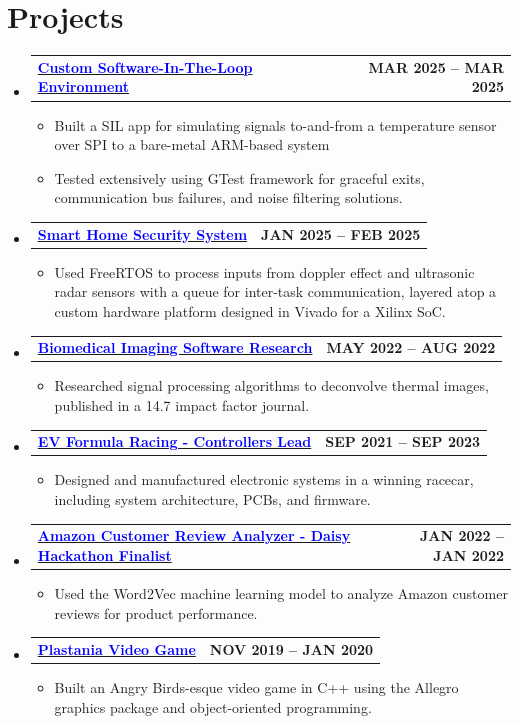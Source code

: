 \documentclass[letterpaper,11pt]{article}
\makeatletter
\newcommand{\resumeItem}[1]{
  \item\small{#1}
}
\newcommand{\resumeProjectHeading}[2]{
    \item
    \begin{tabular*}{1.001\textwidth}{l@{\extracolsep{\fill}}r}
      \small#1 & \textbf{\small #2}\\
    \end{tabular*}\vspace{-7pt}
}
\newcommand{\resumeSubHeadingListStart}{\begin{itemize}[leftmargin=0.0in, label={}]}
\newcommand{\resumeSubHeadingListEnd}{\end{itemize}}
\newcommand{\resumeItemListStart}{\begin{itemize}[itemsep=0pt, parsep=0pt, topsep=2pt, partopsep=0pt]}
\newcommand{\resumeItemListEnd}{\end{itemize}\vspace{-5pt}}
\makeatother
\begin{document}
\section{Projects}
    \vspace{-5pt}
    \resumeSubHeadingListStart
      \resumeProjectHeading
          {\textbf{\href{https://github.com/asso-the-coder/SIL-environment}{\textcolor{blue}{Custom Software-In-The-Loop Environment}}}}{ MAR 2025 -- MAR 2025}
          \resumeItemListStart
            \resumeItem{Built a SIL app for simulating signals to-and-from a temperature sensor over SPI to a bare-metal ARM-based system}
            \resumeItem{Tested extensively using GTest framework for graceful exits, communication bus failures, and noise filtering solutions.}
          \resumeItemListEnd
          \vspace{-13pt}
      \resumeProjectHeading
          {\textbf{\href{https://github.com/asso-the-coder/home-security-system-pynq-z2}{\textcolor{blue}{Smart Home Security System}}}}{ JAN 2025 -- FEB 2025}
          \resumeItemListStart
            \resumeItem{Used FreeRTOS to process inputs from doppler effect and ultrasonic radar sensors with a queue for inter-task communication, layered atop a custom hardware platform designed in Vivado for a Xilinx SoC.}
          \resumeItemListEnd
          \vspace{-13pt}
      \resumeProjectHeading
          {\textbf{\href{https://www.science.org/doi/10.1126/sciadv.adi1899}{\textcolor{blue}{Biomedical Imaging Software Research}}}}{ MAY 2022 -- AUG 2022}
          \resumeItemListStart
            \resumeItem{Researched signal processing algorithms to deconvolve thermal images, published in a 14.7 impact factor journal.}
          \resumeItemListEnd
          \vspace{-13pt}
      \resumeProjectHeading
            {\textbf{\href{https://drive.google.com/drive/folders/1Gp0THWEDytKAZaY5z9e0QTf7O2gkgbx3}{\textcolor{blue}{EV Formula Racing - Controllers Lead}}}}{ SEP 2021 -- SEP 2023}
          \resumeItemListStart
            \resumeItem{Designed and manufactured electronic systems in a winning racecar, including system architecture, PCBs, and firmware.}
          \resumeItemListEnd
          \vspace{-13pt}
      \resumeProjectHeading
          {\textbf{\href{https://github.com/asso-the-coder/synonyms-finder}{\textcolor{blue}{Amazon Customer Review Analyzer - Daisy Hackathon Finalist}}}}{ JAN 2022 -- JAN 2022}
          \resumeItemListStart
            \resumeItem{Used the Word2Vec machine learning model to analyze Amazon customer reviews for product performance.}
          \resumeItemListEnd
          \vspace{-13pt}
      \resumeProjectHeading
          {\textbf{\href{https://github.com/asso-the-coder/plastania-video-game}{\textcolor{blue}{Plastania Video Game}}}}{ NOV 2019 -- JAN 2020}
          \resumeItemListStart
            \resumeItem{Built an Angry Birds-esque video game in C++ using the Allegro graphics package and object-oriented programming.}
          \resumeItemListEnd
    \resumeSubHeadingListEnd
\vspace{-15pt}
\end{document}
